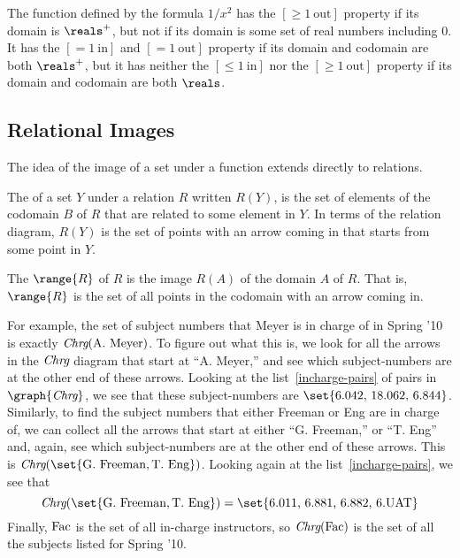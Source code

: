 \begin{example}
  The function defined by the formula $1/x^2$ has the $[\ge 1\
  \text{out}]$ property if its domain is $\reals^+$, but not if its domain
  is some set of real numbers including 0.  It has the $[=1\ \text{in}]$
  and $[=1\ \text{out}]$ property if its domain and codomain are both
  $\reals^+$, but it has neither the $[\le 1\ \text{in}]$ nor the $[\ge 1\
  \text{out}]$ property if its domain and codomain are both $\reals$.
\end{example}

\subsection{Relational Images}
The idea of the image of a set under a function extends directly to
relations.

\begin{definition}
  The %
 of a set $Y$ under a relation $R$ written $R(Y)$,
  is the set of elements of the codomain $B$ of $R$ that are related to
  some element in $Y$.  In terms of the relation diagram, $R(Y)$ is the
  set of points with an arrow coming in that starts from some point in $Y$.
\iffalse
, namely,
\[
R(Y) \eqdef \set{b \in B \suchthat yRb \text{ for some } y \in Y}.
\]\fi
The \term{range} $\range{R}$ of $R$ is the image $R(A)$ of the domain
$A$ of $R$.  That is, $\range{R}$ is the set of all points in the
codomain with an arrow coming in.
\end{definition}

For example, the set of subject numbers that Meyer is in charge of in
Spring '10 is exactly $\textit{Chrg}(\text{A. Meyer})$.  To figure out what
this is, we look for all the arrows in the $\textit{Chrg}$ diagram that
start at ``A. Meyer,'' and see which subject-numbers are at the other
end of these arrows.  Looking at the list~\eqref{incharge-pairs} of
pairs in $\graph{\inchrg}$, we see that these subject-numbers are
$\set{\text{6.042, 18.062, 6.844}}$.  Similarly, to find the subject
numbers that either Freeman or Eng are in charge of, we can collect
all the arrows that start at either ``G. Freeman,'' or ``T. Eng'' and,
again, see which subject-numbers are at the other end of these arrows.
This is $\inchrg(\set{\text{G. Freeman}, \text{T. Eng}})$.  Looking
again at the list~\eqref{incharge-pairs}, we see that
\[
\inchrg(\set{\text{G. Freeman}, \text{T. Eng}}) = \set{\text{6.011, 6.881, 6.882, 6.UAT}}
\]
Finally, $\text{Fac}$ is the set of all in-charge instructors, so
$\textit{Chrg}(\text{Fac})$ is the set of all the subjects listed for Spring
'10.

